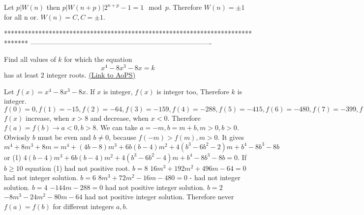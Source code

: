 \begin{solution}
	Let $p|W(n)$ then $p|W(n+p)|2^{n+p}-1=1\mod p.$ Therefore $W(n)=\pm 1$ for all n or.
$W(n)=C, C=\pm 1$.
\end{solution}
*******************************************************************************
-------------------------------------------------------------------------------

\begin{problem}
	Find all values of $k$ for which the equation
\[x^4 - 8 x^3 - 8x = k\]
has at least $2$ integer roots.
	\flushright \href{https://artofproblemsolving.com/community/c6h379595}{(Link to AoPS)}
\end{problem}



\begin{solution}
	Let $f(x)=x^4-8x^3-8x$. If $x$ is integer, $f(x)$ is integer too, Therefore $k$ is integer. 
$f(0)=0,f(1)=-15,f(2)=-64,f(3)=-159,f(4)=-288,f(5)=-415,f(6)=-480,f(7)=-399,f(8)=-64.f(9)=659$ $f(x)$ increase, when $x>8$ and decrease, when $x<0$. Therefore $f(a)=f(b)\to a<0, b>8$. We can take $a=-m,b=m+b,m>0,b>0$. Obviosly $b$ must be even and $b\not =0$, because $f(-m)>f(m),m>0$.
It gives $m^4+8m^3+8m=m^4+(4b-8)m^3+6b(b-4)m^2+4(b^3-6b^2-2)m+b^4-8b^3-8b$ or
(1) $4(b-4)m^3+6b(b-4)m^2+4(b^3-6b^2-4)m+b^4-8b^3-8b=0.$
If $b\ge 10$ equation (1) had not positive root.
$b=8$ $16m^3+192m^2+496m-64=0$ had not integer solution.
$b=6$ $8m^3+72m^2-16m-480=0$ - had not integer solution.
$b=4$ $-144m-288=0$ had not positive integer solution.
$b=2$ $-8m^3-24m^2-80m-64$ had not positive integer solution.
Therefore never $f(a)=f(b)$ for different integers $a,b$.
\end{solution}



